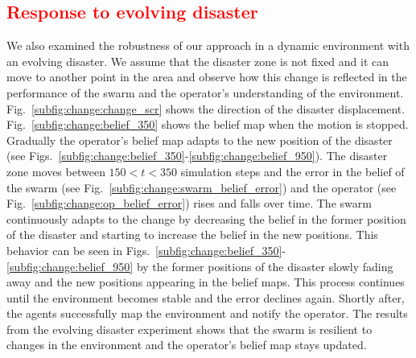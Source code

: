 \documentclass[runningheads]{llncs}%
\begin{document}
\subsection{\textcolor{red}{Response to evolving disaster}}
We also examined the robustness of our approach in a dynamic environment with an evolving disaster. We assume that the disaster zone is not fixed and it can move to another point in the area and observe how this change is reflected in the performance of the swarm and the operator's understanding of the environment. %
Fig.~\ref{subfig:change:change_scr} shows the direction of the disaster displacement. Fig.~\ref{subfig:change:belief_350} shows the belief map when the motion is stopped. 
Gradually the operator's belief map adapts to the new position of the disaster (see Figs.~\ref{subfig:change:belief_350}-\ref{subfig:change:belief_950}). The disaster zone moves between $150 < t < 350$ simulation steps and the error in the belief of the swarm (see Fig.~\ref{subfig:change:swarm_belief_error}) and the operator (see Fig.~\ref{subfig:change:op_belief_error}) rises and falls over time. %
The swarm continuously adapts to the change by decreasing the belief in the former position of the disaster and starting to increase the belief in the new positions. This behavior can be seen in Figs.~\ref{subfig:change:belief_350}-\ref{subfig:change:belief_950} by the former positions of the disaster slowly fading away and the new positions appearing in the belief maps. This process continues until the environment becomes stable and the error declines again. Shortly after, the agents successfully map the environment and notify the operator. The results from the evolving disaster experiment shows that the swarm is resilient to changes in the environment and the operator's belief map stays updated. 
\end{document}
